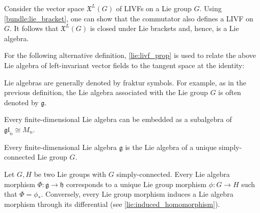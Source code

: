     \begin{example}
        Consider the vector space $\mathfrak{X}^L(G)$ of LIVFs on a Lie group $G$. Using \cref{bundle:lie_bracket}, one can show that the commutator also defines a LIVF on $G$. It follows that $\mathfrak{X}^L(G)$ is closed under Lie brackets and, hence, is a Lie algebra.
    \end{example}
    For the following alternative definition, \cref{lie:livf_prop} is used to relate the above Lie algebra of left-invariant vector fields to the tangent space at the identity:
    \begin{notation}
        Lie algebras are generally denoted by fraktur symbols. For example, as in the previous definition, the Lie algebra associated with the Lie group $G$ is often denoted by $\mathfrak{g}$.
    \end{notation}

    \begin{theorem}[Ado]\label{lie:ado}
        Every finite-dimensional Lie algebra can be embedded as a subalgebra of $\mathfrak{gl}_n\cong M_n$.
    \end{theorem}
    \begin{theorem}
        Every finite-dimensional Lie algebra $\mathfrak{g}$ is the Lie algebra of a unique simply-connected Lie group $G$.
    \end{theorem}

    \begin{property}\label{lie:prop_hom}
        Let $G,H$ be two Lie groups with $G$ simply-connected. Every Lie algebra morphism $\Phi:\mathfrak{g}\rightarrow\mathfrak{h}$ corresponds to a unique Lie group morphism $\phi:G\rightarrow H$ such that $\Phi=\phi_*$. Conversely, every Lie group morphism induces a Lie algebra morphism through its differential (see \cref{lie:induced_homomorphism}).
    \end{property}

